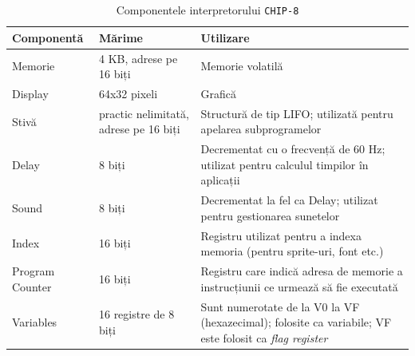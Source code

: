 \documentclass[a4paper]{article}
\begin{document}
\begin{table}
	\begin{center}
		\begin{tabular}{ |p{5em}|p{8em}|p{16em}| }
			\hline
			\textbf{Componentă} & \textbf{Mărime}                       & \textbf{Utilizare}                                                                                             \\
			\hline\hline
			Memorie             & 4 KB, adrese pe 16 biți               & Memorie volatilă                                                                                               \\
			\hline
			Display             & 64x32 pixeli                          & Grafică                                                                                                        \\
			\hline
			Stivă               & practic nelimitată, adrese pe 16 biți & Structură de tip LIFO; utilizată pentru apelarea subprogramelor                                                \\
			\hline
			Delay               & 8 biți                                & Decrementat cu o frecvență de 60 Hz; utilizat pentru calculul timpilor în aplicații                            \\
			\hline
			Sound               & 8 biți                                & Decrementat la fel ca Delay; utilizat pentru gestionarea sunetelor                                             \\
			\hline
			Index               & 16 biți                               & Registru utilizat pentru a indexa memoria (pentru sprite-uri, font etc.)                                       \\
			\hline
			Program Counter     & 16 biți                               & Registru care indică adresa de memorie a instrucțiunii ce urmează să fie executată                             \\
			\hline
			Variables           & 16 registre de 8 biți                 & Sunt numerotate de la V0 la VF (hexazecimal); folosite ca variabile; VF este folosit ca \textit{flag register} \\
			\hline
		\end{tabular}
		\caption{Componentele interpretorului \texttt{CHIP-8} \cite{langhoff}}
		\label{tab:componente}
	\end{center}
\end{table}

\end{document}
